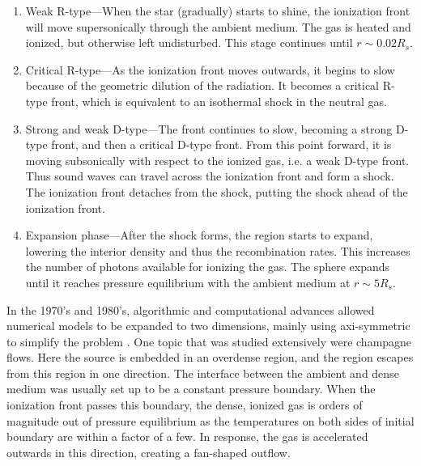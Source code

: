 \documentclass[apj,onecolumn]{emulateapj}
\begin{document}
\begin{enumerate}
\item Weak R-type---When the star (gradually) starts to shine, the
  ionization front will move supersonically through the ambient
  medium.  The gas is heated and ionized, but otherwise left
  undisturbed.  This stage continues until $r \sim 0.02R_s$.
\item Critical R-type---As the ionization front moves outwards, it
  begins to slow because of the geometric dilution of the radiation.
  It becomes a critical R-type front, which is equivalent to an
  isothermal shock in the neutral gas.
\item Strong and weak D-type---The front continues to slow, becoming a
  strong D-type front, and then a critical D-type front.  From this
  point forward, it is moving subsonically with respect to the ionized
  gas, i.e. a weak D-type front.  Thus sound waves can travel across
  the ionization front and form a shock.  The ionization front
  detaches from the shock, putting the shock ahead of the ionization
  front.
\item Expansion phase---After the shock forms, the  region
  starts to expand, lowering the interior density and thus the
  recombination rates.  This increases the number of photons available
  for ionizing the gas.  The sphere expands until it reaches pressure
  equilibrium with the ambient medium at $r \sim 5R_s$.
\end{enumerate}
%

In the 1970's and 1980's, algorithmic and computational advances
allowed numerical models to be expanded to two dimensions, mainly
using axi-symmetric to simplify the problem
\citep[e.g.][]{Bodenheimer79, Sandford82, Yorke83}.  One topic that was
studied extensively were champagne flows.  Here the source is embedded
in an overdense region, and the  region escapes from this
region in one direction.  The interface between the ambient and dense
medium was usually set up to be a constant pressure boundary.  When
the ionization front passes this boundary, the dense, ionized gas is
orders of magnitude out of pressure equilibrium as the temperatures on
both sides of initial boundary are within a factor of a few.  In
response, the gas is accelerated outwards in this direction, creating
a fan-shaped outflow.
\end{document}
